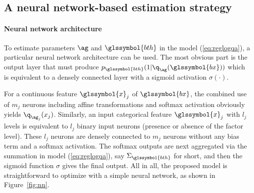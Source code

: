 \subsection{A neural network-based estimation strategy} \label{sec:estim}

\paragraph{Neural network architecture}

To estimate parameters $\ag$ and $\glssymbol{bth}$ in the model (\ref{eq:reglogqa}), a particular neural network architecture can be used. The most obvious part is the output layer that must produce $p_{\glssymbol{bth}}(1|\q_{\ag}(\glssymbol{bx}))$ which is equivalent to a densely connected layer with a sigmoid activation $\sigma (\cdot)$.

For a continuous feature $\glssymbol{x}_j$ of $\glssymbol{bx}$, the combined use of $m_j$ neurons including affine transformations and softmax activation obviously yields $\q_{\ag_{j}}(x_j)$. Similarly, an input categorical feature $\glssymbol{x}_j$ with $l_j$ levels is equivalent to $l_j$ binary input neurons (presence or absence of the factor level). These $l_j$ neurons are densely connected to $m_j$ neurons without any bias term and a softmax activation. The softmax outputs are next aggregated via the summation in model (\ref{eq:reglogqa}), say $\Sigma_{\glssymbol{bth}}$ for short, and then the sigmoid function $\sigma$ gives the final output. All in all, the proposed model is straightforward to optimize with a simple neural network, as shown in Figure~\ref{fig:nn}.


\def\layersep{2.5cm}

